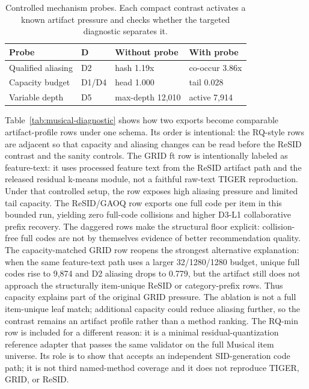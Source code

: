 \begin{table}[t]
\caption{Controlled mechanism probes. Each compact contrast activates a known
artifact pressure and checks whether the targeted diagnostic separates it.}
\label{tab:mechanism-probes}
\scriptsize
\setlength{\tabcolsep}{2pt}
\begin{tabularx}{\columnwidth}{@{}>{\raggedright\arraybackslash}p{}>{\centering\arraybackslash}p{}>{\raggedright\arraybackslash}X>{\raggedright\arraybackslash}X@{}}
\toprule
Probe & D & Without probe & With probe \\
\midrule
Qualified aliasing & D2 & hash 1.19x & co-occur 3.86x \\
Capacity budget & D1/D4 & head 1.000 & tail 0.028 \\
Variable depth & D5 & max-depth 12,010 & active 7,914 \\
\bottomrule
\end{tabularx}
\end{table}

Table~\ref{tab:musical-diagnostic} shows how two exports become comparable
artifact-profile rows under one schema. Its order is intentional: the
RQ-style rows are adjacent so that capacity and aliasing changes can be read
before the ReSID contrast and the sanity controls.
The GRID ft row is intentionally labeled as feature-text: it uses processed
feature text from the ReSID artifact path and the released residual
k-means module, not a faithful raw-text TIGER reproduction. Under that
controlled setup, the row exposes high aliasing pressure and limited tail
capacity. The ReSID/GAOQ row exports one full code per item in this bounded
run, yielding zero full-code collisions and higher D3-L1 collaborative prefix
recovery. The daggered rows make the structural floor explicit: collision-free
full codes are not by themselves evidence of better recommendation quality.
The capacity-matched GRID row reopens the strongest alternative explanation:
when the same feature-text path uses a larger
32/1280/1280 budget, unique full codes rise to 9,874 and D2 aliasing drops to
0.779, but the artifact still does not approach the structurally item-unique
ReSID or category-prefix rows. Thus capacity explains part of the original GRID
pressure. The ablation is not a full item-unique leaf match; additional
capacity could reduce aliasing further, so the contrast remains an artifact
profile rather than a method ranking. The RQ-min row is included for a
different reason: it is a minimal residual-quantization reference adapter that
passes the same validator on the full Musical item universe. Its role is to
show that \tool accepts an independent SID-generation code path; it is not
third named-method coverage and it does not reproduce TIGER, GRID, or ReSID.

